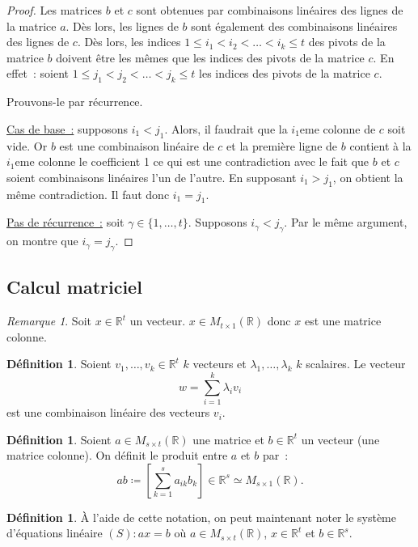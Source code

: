 \documentclass{article}
\newcommand{\R}{\mathbb R}
\newcommand{\M}[3]{M_{#1 \times #2}(#3)}
\theoremstyle{definition}
\newtheorem{déf}[thm]{Définition}
\theoremstyle{remark}
\newtheorem*{rmq}{Remarque}
\begin{document}
		\begin{proof} Les matrices $b$ et $c$ sont obtenues par combinaisons linéaires des lignes de la matrice $a$. Dès lors, les lignes de $b$ sont également des
		combinaisons linéaires des lignes de $c$. Dès lors, les indices $1 \leq i_1 < i_2 < \ldots < i_k \leq t$ des pivots de la matrice $b$ doivent être les mêmes que
		les indices des pivots de la matrice $c$. En effet~: soient $1 \leq j_1 < j_2 < \ldots <  j_k \leq t$ les indices des pivots de la matrice $c$.

		Prouvons-le par récurrence. 
		
		\underline{Cas de base~:} supposons $i_1 < j_1$. Alors, il faudrait que la $i_1$eme colonne de $c$ soit vide. Or $b$ est une combinaison linéaire de $c$ et la
		première ligne de $b$ contient à la $i_1$eme colonne le coefficient 1 ce qui est une contradiction avec le fait que $b$ et $c$ soient combinaisons linéaires
		l'un de l'autre. En supposant $i_1 > j_1$, on obtient la même contradiction. Il faut donc $i_1 = j_1$.
		
		\underline{Pas de récurrence~:} soit $\gamma \in \{1, \dotsc, t\}$. Supposons $i_\gamma < j_\gamma$. Par le même argument, on montre que $i_\gamma = j_\gamma$.
		\end{proof}

	\subsection{Calcul matriciel}
		\begin{rmq} Soit $x \in \R^t$ un vecteur. $x \in \M t1\R$ donc $x$ est une matrice colonne. \end{rmq}

		\begin{déf} Soient $v_1, \dotsc, v_k \in \R^t$ $k$ vecteurs et $\lambda_1, \dotsc, \lambda_k$ $k$ scalaires. Le vecteur \[w = \sum_{i=1}^k\lambda_iv_i\]
		est une combinaison linéaire des vecteurs $v_i$. \end{déf}

		\begin{déf} Soient $a \in \M st\R$ une matrice et $b \in \R^t$ un vecteur (une matrice colonne). On définit le produit entre $a$ et $b$ par~:
		\[ab \coloneqq \left[\sum_{k=1}^sa_{ik}b_k\right] \in \R^s \simeq \M s1\R.\] \end{déf}

		\begin{déf} À l'aide de cette notation, on peut maintenant noter le système d'équations linéaire $(S) : ax = b$ où $a \in \M st\R$, $x \in \R^t$ et $b \in \R^s$.
		\end{déf}
\end{document}
